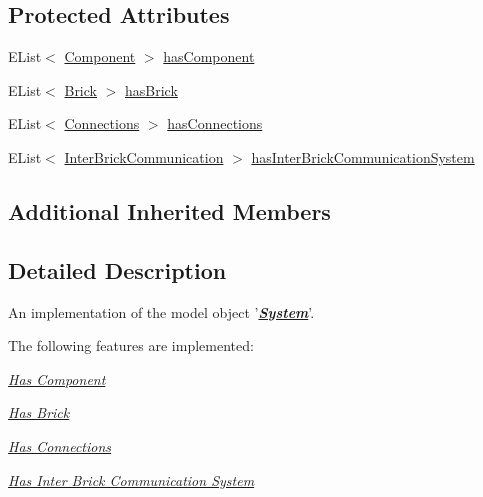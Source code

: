 \subsection*{Protected Attributes}
\begin{DoxyCompactItemize}
\item 
E\-List$<$ \hyperlink{interfaceshootingmachineemfmodel_1_1_component}{Component} $>$ \hyperlink{classshootingmachineemfmodel_1_1impl_1_1_system_impl_a1105994c6e0988d96fe8121325eef277}{has\-Component}
\item 
E\-List$<$ \hyperlink{interfaceshootingmachineemfmodel_1_1_brick}{Brick} $>$ \hyperlink{classshootingmachineemfmodel_1_1impl_1_1_system_impl_a2a4113b2f05fe2d37f98734f0216703d}{has\-Brick}
\item 
E\-List$<$ \hyperlink{interfaceshootingmachineemfmodel_1_1_connections}{Connections} $>$ \hyperlink{classshootingmachineemfmodel_1_1impl_1_1_system_impl_a0cf68c4f9c477dd5a15cc061dea1454b}{has\-Connections}
\item 
E\-List$<$ \hyperlink{interfaceshootingmachineemfmodel_1_1_inter_brick_communication}{Inter\-Brick\-Communication} $>$ \hyperlink{classshootingmachineemfmodel_1_1impl_1_1_system_impl_afa9091ffbd85dd16705ce7462c2c3286}{has\-Inter\-Brick\-Communication\-System}
\end{DoxyCompactItemize}
\subsection*{Additional Inherited Members}


\subsection{Detailed Description}
An implementation of the model object '{\itshape {\bfseries \hyperlink{interfaceshootingmachineemfmodel_1_1_system}{System}}}'.

The following features are implemented\-: 
\begin{DoxyItemize}
\item \hyperlink{classshootingmachineemfmodel_1_1impl_1_1_system_impl_ae7f2544d43d2a53d5679ae3d511cffd4}{{\itshape Has Component}} 
\item \hyperlink{classshootingmachineemfmodel_1_1impl_1_1_system_impl_af311fd2939009d1106d5643403259d30}{{\itshape Has Brick}} 
\item \hyperlink{classshootingmachineemfmodel_1_1impl_1_1_system_impl_a6573b6b1522a452bd631415525126000}{{\itshape Has Connections}} 
\item \hyperlink{classshootingmachineemfmodel_1_1impl_1_1_system_impl_aeb13534d36d6f772d317c7c2c8b47241}{{\itshape Has Inter Brick Communication System}} 
\end{DoxyItemize}

